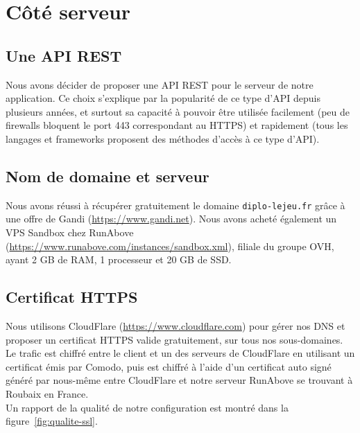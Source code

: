 \section{Côté serveur}

	\subsection{Une API REST}
		Nous avons décider de proposer une API REST pour le serveur de notre application. Ce choix s'explique par la popularité de ce type d'API depuis plusieurs années, et surtout sa capacité à pouvoir être utilisée facilement (peu de firewalls bloquent le port 443 correspondant au HTTPS) et rapidement (tous les langages et frameworks proposent des méthodes d'accès à ce type d'API).

	\subsection{Nom de domaine et serveur}
		Nous avons réussi à récupérer gratuitement le domaine \texttt{diplo-lejeu.fr} grâce à une offre de Gandi (\url{https://www.gandi.net}). Nous avons acheté également un VPS Sandbox chez RunAbove (\url{https://www.runabove.com/instances/sandbox.xml}), filiale du groupe OVH, ayant 2 GB de RAM, 1 processeur et 20 GB de SSD.

	\subsection{Certificat HTTPS}
		Nous utilisons CloudFlare (\url{https://www.cloudflare.com}) pour gérer nos DNS et proposer un certificat HTTPS valide gratuitement, sur tous nos sous-domaines. Le trafic est chiffré entre le client et un des serveurs de CloudFlare en utilisant un certificat émis par Comodo, puis est chiffré à l'aide d'un certificat auto signé généré par nous-même entre CloudFlare et notre serveur RunAbove se trouvant à Roubaix en France.\\

		Un rapport de la qualité de notre configuration est montré dans la figure~\ref{fig:qualite-ssl}.

